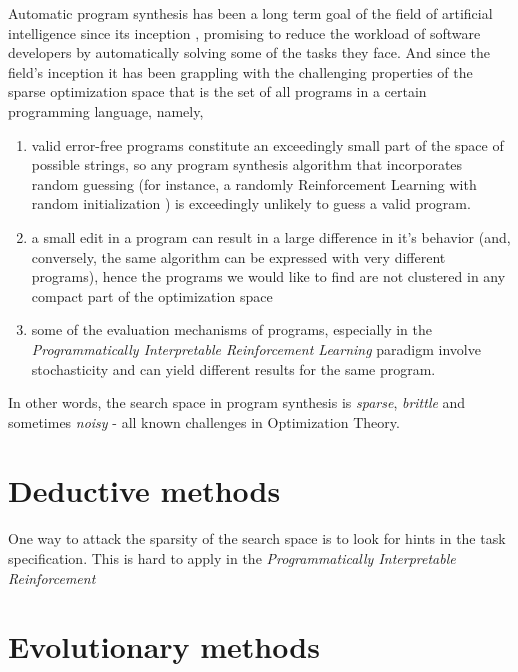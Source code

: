 Automatic program synthesis has been a long term goal of the field of artificial intelligence since its inception \cite{mannaAutomaticProgramSynthesis1971}, promising to reduce the workload of software developers by automatically solving some of the tasks they face.
And since the field's inception it has been grappling with the challenging properties of the sparse optimization space \cite{alurSyntaxguidedSynthesis2013, davidProgramSynthesisChallenges2017} that is the set of all programs in a certain programming language, namely, 
\begin{enumerate}
    \item valid error-free programs constitute an exceedingly small part of the space of possible strings, so any program synthesis algorithm that incorporates random guessing (for instance, a randomly Reinforcement Learning with random initialization \cite{suttonReinforcementLearningSecond2018}) is exceedingly unlikely to guess a valid program.
    \item a small edit in a program can result in a large difference in it's behavior (and, conversely, the same algorithm can be expressed with very different programs), hence the programs we would like to find are not clustered in any compact part of the optimization space
    \item some of the evaluation mechanisms of programs, especially in the \emph{Programmatically Interpretable Reinforcement Learning} paradigm involve stochasticity and can yield different results for the same program.
\end{enumerate}

In other words, the search space in program synthesis is \emph{sparse}, \emph{brittle} and sometimes \emph{noisy} \cite{arnoldNoisyOptimizationEvolution2002} - all known challenges in Optimization Theory.

\section{Deductive methods}

One way to attack the sparsity of the search space is to look for hints in the task specification. 
This is hard to apply in the \emph{Programmatically Interpretable Reinforcement}

\newpage
\section{Evolutionary methods}

\newpage
